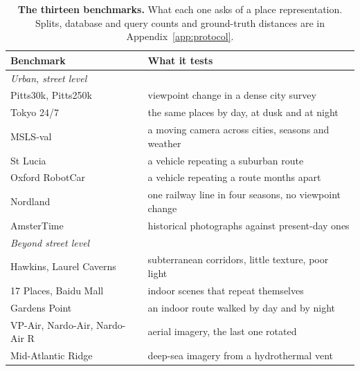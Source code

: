 \begin{table}[t]
\caption{\textbf{The thirteen benchmarks.} What each one asks of a place representation. Splits, database and query counts and ground-truth distances are in Appendix~\ref{app:protocol}.}
\label{tab:datasets}
\centering
{\footnotesize\setlength{\tabcolsep}{4pt}%
\begin{tabular}{ll}
\toprule
Benchmark & What it tests \\
\midrule
\multicolumn{2}{l}{\emph{Urban, street level}} \\
Pitts30k, Pitts250k & viewpoint change in a dense city survey \\
Tokyo 24/7 & the same places by day, at dusk and at night \\
MSLS-val & a moving camera across cities, seasons and weather \\
St Lucia & a vehicle repeating a suburban route \\
Oxford RobotCar & a vehicle repeating a route months apart \\
Nordland & one railway line in four seasons, no viewpoint change \\
AmsterTime & historical photographs against present-day ones \\
\midrule
\multicolumn{2}{l}{\emph{Beyond street level}} \\
Hawkins, Laurel Caverns & subterranean corridors, little texture, poor light \\
17 Places, Baidu Mall & indoor scenes that repeat themselves \\
Gardens Point & an indoor route walked by day and by night \\
VP-Air, Nardo-Air, Nardo-Air R & aerial imagery, the last one rotated \\
Mid-Atlantic Ridge & deep-sea imagery from a hydrothermal vent \\
\bottomrule
\end{tabular}%
}
\end{table}



